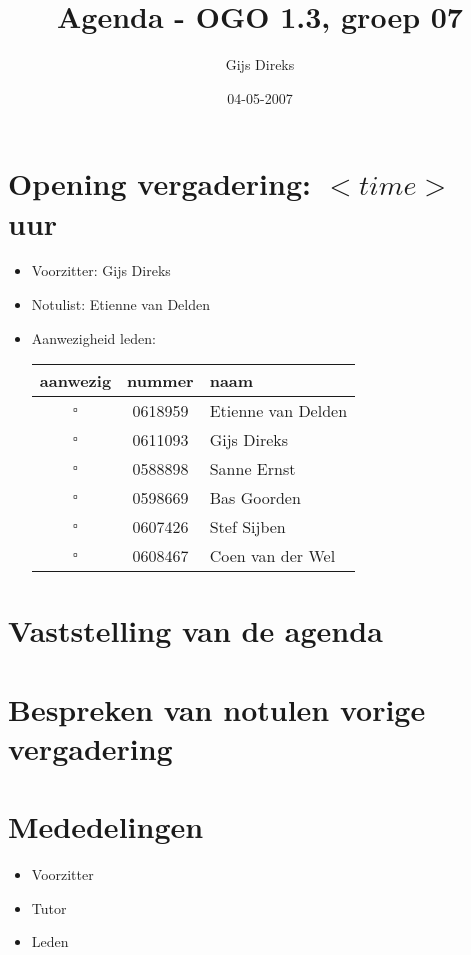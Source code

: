 \documentclass[]{article}
\title{Agenda - OGO 1.3, groep 07 }
\author{ Gijs Direks }
\date{04-05-2007}
\begin{document}
\maketitle


\section{Opening vergadering: $<time>$ uur }
  \begin{itemize}
    \item Voorzitter: Gijs Direks
    \item Notulist: Etienne van Delden
    \item Aanwezigheid leden:

    \begin{tabular}{c | c | l}
      aanwezig & nummer & naam \\
      \hline
      $\square$ & 0618959 & Etienne van Delden \\
      $\square$ & 0611093 & Gijs Direks \\
      $\square$ & 0588898 & Sanne Ernst \\
      $\square$ & 0598669 & Bas Goorden \\
      $\square$ & 0607426 & Stef Sijben\\
      $\square$ & 0608467 & Coen van der Wel \\

    \end{tabular}

  \end{itemize}

\section{Vaststelling van de agenda}

\section{Bespreken van notulen vorige vergadering}


 \section{Mededelingen}
 \begin{itemize}
   \item Voorzitter
   \item Tutor
   \item Leden
 \end{itemize}
\end{document}
